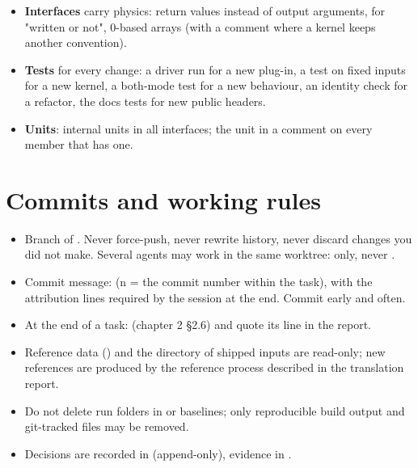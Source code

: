 \begin{itemize}
 for integer powers; quad precision where required), the origin comments and the markers for
behaviour that differs between the two modes are described in the translation report\footnote{From SIMC to SIMC++, ``SIMC Fortran → SIMC++ translation report'' ()},
chapters 3-5.
\item \textbf{Interfaces} carry physics: return values instead of output arguments,  for "written or not",
0-based arrays (with a comment where a kernel keeps another convention).
\item \textbf{Tests} for every change: a driver run for a new plug-in, a test on fixed inputs for a new kernel, a both-mode test
for a new  behaviour, an identity check for a refactor, the docs tests for new public headers.
\item \textbf{Units}: internal units in all interfaces; the unit in a \code{/\allowbreak{}/\allowbreak{}/} comment on every member that has one.
\end{itemize}
\section{\texorpdfstring{Commits and working rules}{Commits and working rules}}\label{developer_manual-06u5fstandards:62-commits-and-working-rules}
\begin{itemize}
\item Branch  of . Never force-push, never rewrite history, never discard changes you did not
make. Several agents may work in the same worktree:  only, never .
\item Commit message:  (n = the commit number within the task), with the attribution lines
required by the session at the end. Commit early and often.
\item At the end of a task:  (chapter 2 §2.6) and quote its
 line in the report.
\item Reference data () and the directory of shipped inputs are read-only; new references
are produced by the reference process described in the translation report.
\item Do not delete run folders in  or baselines; only reproducible build output and git-tracked
files may be removed.
\item Decisions are recorded in  (append-only),\allowbreak{} evidence in .
\end{itemize}

